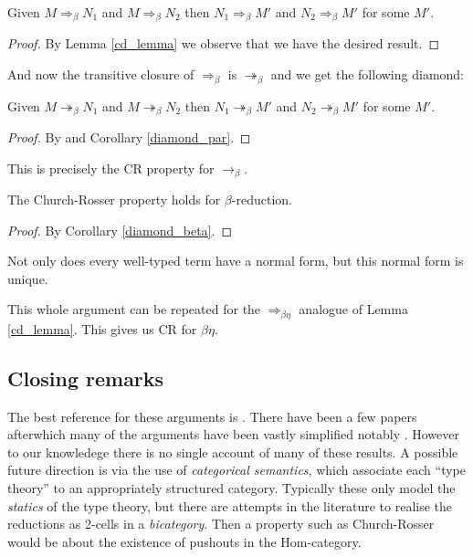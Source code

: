\begin{cor}\label{diamond_par}
    Given $M \Rightarrow_\beta N_1$ and $M \Rightarrow_\beta N_2$ then $N_1 \Rightarrow_\beta M'$ and $N_2 \Rightarrow_\beta M'$ for some $M'$.
\end{cor}

\begin{proof}
    By Lemma \ref{cd_lemma} we observe that we have the desired result.
\end{proof}

And now the transitive closure of $\Rightarrow_\beta$ is $\twoheadrightarrow_\beta$ and we get the following diamond:

\begin{cor}\label{diamond_beta}
    Given $M \twoheadrightarrow_\beta N_1$ and $M \twoheadrightarrow_\beta N_2$ then $N_1 \twoheadrightarrow_\beta M'$ and $N_2 \twoheadrightarrow_\beta M'$ for some $M'$.
\end{cor}

\begin{proof}
    By \cite[Lemma 3.2.2]{barendregt1984lambda} and Corollary \ref{diamond_par}.
\end{proof}

This is precisely the CR property for $\to_\beta$.

\begin{theorem}
    The Church-Rosser property holds for $\beta$-reduction.
\end{theorem}

\begin{proof}
    By Corollary \ref{diamond_beta}.
\end{proof}

\begin{remark}
    Not only does every well-typed term have a normal form, but this normal form is unique.
\end{remark}

\begin{remark}
    This whole argument can be repeated for the $\Rightarrow_{\beta\eta}$ analogue of Lemma \ref{cd_lemma}. This gives us CR for $\beta \eta$.
\end{remark}

\subsection{Closing remarks}

The best reference for these arguments is \cite{barendregt1984lambda}. There have been a few papers afterwhich many of the arguments have been vastly simplified notably \cite{TakahashiM1989PRIL}. However to our knowledege there is no single account of many of these results. A possible future direction is via the use of \emph{categorical semantics}, which associate each ``type theory'' to an appropriately structured category. Typically these only model the \emph{statics} of the type theory, but there are attempts in the literature to realise the reductions as 2-cells in a \emph{bicategory}. Then a property such as Church-Rosser would be about the existence of pushouts in the Hom-category. 

